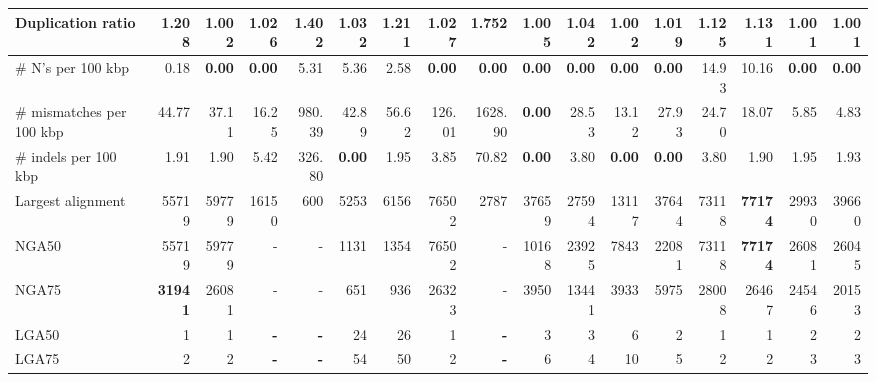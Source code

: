 \documentclass[12pt,a4paper]{article}
\begin{document}
\begin{table}[ht]
\begin{center}
\begin{tabular}{|l*{16}{|r}|}
Duplication ratio & 1.208 & 1.002 & 1.026 & 1.402 & 1.032 & 1.211 & 1.027 & 1.752 & 1.005 & 1.042 & 1.002 & 1.019 & 1.125 & 1.131 & {\bf 1.001} & {\bf 1.001} \\ \hline
\# N's per 100 kbp & 0.18 & {\bf 0.00} & {\bf 0.00} & 5.31 & 5.36 & 2.58 & {\bf 0.00} & {\bf 0.00} & {\bf 0.00} & {\bf 0.00} & {\bf 0.00} & {\bf 0.00} & 14.93 & 10.16 & {\bf 0.00} & {\bf 0.00} \\ \hline
\# mismatches per 100 kbp & 44.77 & 37.11 & 16.25 & 980.39 & 42.89 & 56.62 & 126.01 & 1628.90 & {\bf 0.00} & 28.53 & 13.12 & 27.93 & 24.70 & 18.07 & 5.85 & 4.83 \\ \hline
\# indels per 100 kbp & 1.91 & 1.90 & 5.42 & 326.80 & {\bf 0.00} & 1.95 & 3.85 & 70.82 & {\bf 0.00} & 3.80 & {\bf 0.00} & {\bf 0.00} & 3.80 & 1.90 & 1.95 & 1.93 \\ \hline
Largest alignment & 55719 & 59779 & 16150 & 600 & 5253 & 6156 & 76502 & 2787 & 37659 & 27594 & 13117 & 37644 & 73118 & {\bf 77174} & 29930 & 39660 \\ \hline
NGA50 & 55719 & 59779 & - & - & 1131 & 1354 & 76502 & - & 10168 & 23925 & 7843 & 22081 & 73118 & {\bf 77174} & 26081 & 26045 \\ \hline
NGA75 & {\bf 31941} & 26081 & - & - & 651 & 936 & 26323 & - & 3950 & 13441 & 3933 & 5975 & 28008 & 26467 & 24546 & 20153 \\ \hline
LGA50 & 1 & 1 & {\bf -} & {\bf -} & 24 & 26 & 1 & {\bf -} & 3 & 3 & 6 & 2 & 1 & 1 & 2 & 2 \\ \hline
LGA75 & 2 & 2 & {\bf -} & {\bf -} & 54 & 50 & 2 & {\bf -} & 6 & 4 & 10 & 5 & 2 & 2 & 3 & 3 \\ \hline
\end{tabular}
\end{center}
\end{table}
\end{document}
